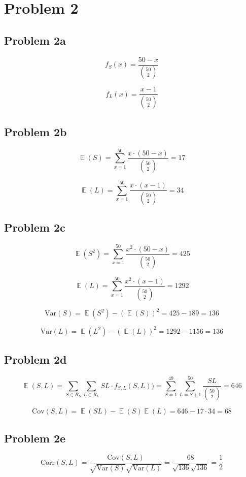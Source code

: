 \documentclass{article}
\newcommand{\Var}{\mathrm{Var}}
\newcommand{\Cov}{\mathrm{Cov}}
\newcommand{\Corr}{\mathrm{Corr}}
\DeclareMathOperator{\EX}{\mathbb{E}}
\begin{document}
\section{Problem 2}

\subsection{Problem 2a}

$$f_S(x) = \frac{50 - x}{\binom{50}{2}}$$

$$f_L(x) = \frac{x - 1}{\binom{50}{2}}$$

\subsection{Problem 2b}

$$\EX(S) = \sum_{x = 1}^{50} \frac{x \cdot (50 - x)}{\binom{50}{2}} = 17$$

$$\EX(L) = \sum_{x = 1}^{50} \frac{x \cdot (x - 1)}{\binom{50}{2}} = 34$$

\subsection{Problem 2c}

$$\EX(S^2) = \sum_{x = 1}^{50} \frac{x^2 \cdot (50 - x)}{\binom{50}{2}} = 425$$

$$\EX(L) = \sum_{x = 1}^{50} \frac{x^2 \cdot (x - 1)}{\binom{50}{2}} = 1292$$

$$\Var(S) = \EX(S^2) - (\EX(S))^2 = 425 - 189 = 136$$

$$\Var(L) = \EX(L^2) - (\EX(L))^2 = 1292 - 1156 = 136$$

\subsection{Problem 2d}

$$\EX(S, L) = \sum_{S \in R_S}^{} \sum_{L \in R_L}^{} SL \cdot f_{S, L}(S, L)) = \sum_{S = 1}^{49} \sum_{L = S + 1}^{50} \frac{SL}{\binom{50}{2}} = 646$$

$$\Cov(S, L) = \EX(SL) - \EX(S)\EX(L) = 646 - 17 \cdot 34 = 68$$

\subsection{Problem 2e}

$$\Corr(S, L) = \frac{\Cov(S, L)}{\sqrt{\Var(S)}\sqrt{\Var(L)}} = \frac{68}{\sqrt{136}\sqrt{136}} = \frac{1}{2}$$
\end{document}
